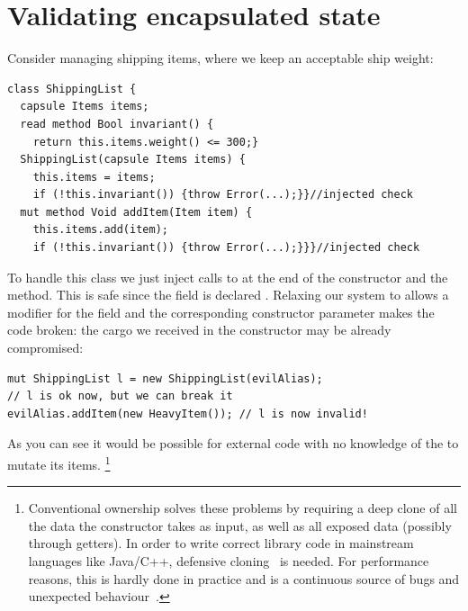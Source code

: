 \saveSpace
\section{Validating encapsulated state}
\label{s:encapsulated}
\saveSpace




Consider managing shipping items, where we keep an acceptable ship weight:
\saveSpace
\begin{lstlisting}
class ShippingList {
  capsule Items items;
  read method Bool invariant() {
    return this.items.weight() <= 300;}
  ShippingList(capsule Items items) {
    this.items = items;
    if (!this.invariant()) {throw Error(...);}}//injected check
  mut method Void addItem(Item item) {
    this.items.add(item);
    if (!this.invariant()) {throw Error(...);}}}//injected check
\end{lstlisting}
\saveSpace
To handle this class we just inject calls to \Q@invariant@ at the end of the constructor and the \Q@addItem@ method.
This is safe since the \Q@items@ field is declared \Q@capsule@.
Relaxing our system to allows a \Q@mut@ modifier for
the \Q@items@ field and the corresponding constructor parameter 
makes the code broken:
the cargo we received in the constructor may be already compromised:
\saveSpace
\begin{lstlisting}
mut ShippingList l = new ShippingList(evilAlias);
// l is ok now, but we can break it
evilAlias.addItem(new HeavyItem()); // l is now invalid!
\end{lstlisting}
\saveSpace 
As you can see it would be possible for external code with no knowledge of the \Q@ShippingList@ to mutate its items.%
\footnote{
Conventional ownership solves these problems by requiring a deep clone of all the data the constructor takes as input, as well as all exposed data (possibly through getters).
In order to write correct library code in mainstream languages like Java/C++, defensive cloning~\cite{Bloch08} is needed.
For performance reasons, this is hardly done in practice and is a continuous source of bugs and unexpected behaviour~\cite{Bloch08}.}

